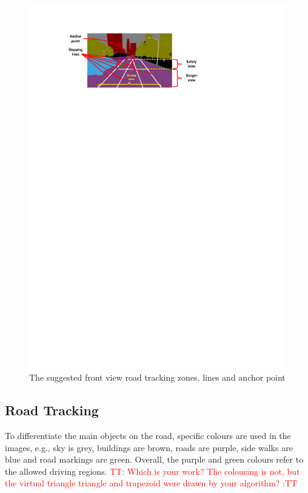 \documentclass{svproc}
\renewcommand{\tt}[1]{\textcolor{red} {TT: #1 :TT} }
\begin{document}
\begin{figure}[!ht]
	\centering
	\includegraphics[scale=.83,trim=3cm 22.5cm 7.1cm 2cm,clip]{segmentation_regions2.pdf}
	\vspace{-4ex}\caption{The suggested front view road tracking zones, lines and anchor point}
	\label{Fig:segmentation_regions1}\vspace{-0.5cm}
\end{figure}
\subsection{Road Tracking}

To differentiate the main objects on the road, specific colours are used in the images, e.g., sky is grey, buildings are brown, roads are purple, side walks are blue and road markings are green. Overall, the purple and green colours refer to the allowed driving regions.  \tt{Which is your work? The colouring is not, but the virtual triangle triangle and trapezoid were drawn by your algorithm? }  
\end{document}
